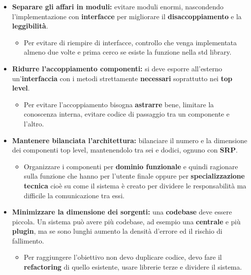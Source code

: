 \begin{itemize}
    \begin{itemize}
        \item Per evitare troppi parametri utilizzo il design pattern \textbf{Parameter Object} creando un \textbf{DTO} o più di una classe per raggruppare dati correlati.
    \end{itemize}
    \item \textbf{Separare gli affari in moduli:} evitare moduli enormi, nascondendo l'implementazione con \textbf{interfacce} per migliorare il \textbf{disaccoppiamento} e la \textbf{leggibilità}.
    \begin{itemize}
        \item Per evitare di riempire di interfacce, controllo che venga implementata almeno due volte e prima cerco se esiste la funzione nella std library.
    \end{itemize}
    \item \textbf{Ridurre l'accoppiamento componenti:} si deve esporre all'esterno un'\textbf{interfaccia} con i metodi strettamente \textbf{necessari} soprattutto nei \textbf{top level}.
    \begin{itemize}
        \item Per evitare l'accoppiamento bisogna \textbf{astrarre} bene, limitare la conoscenza interna, evitare codice di passaggio tra un componente e l'altro.
    \end{itemize}
    \item \textbf{Mantenere bilanciata l'architettura:} bilanciare il numero e la dimensione dei componenti top level, mantenendolo tra sei e dodici, ognuno con \textbf{SRP}.
    \begin{itemize}
        \item Organizzare i componenti per \textbf{dominio funzionale} e quindi ragionare sulla funzione che hanno per l'utente finale oppure per \textbf{specializzazione tecnica} cioè su come il sistema è creato per dividere le responsabilità ma difficile la comunicazione tra essi.
    \end{itemize}
    \item \textbf{Minimizzare la dimensione dei sorgenti:} una \textbf{codebase} deve essere piccola. Un sistema può avere più codebase, ad esempio una \textbf{centrale} e più \textbf{plugin}, ma se sono lunghi aumento la densità d'errore ed il rischio di fallimento.
    \begin{itemize}
        \item Per raggiungere l'obiettivo non devo duplicare codice, devo fare il \textbf{refactoring} di quello esistente, usare librerie terze e dividere il sistema.

\end{itemize}
\end{itemize}
